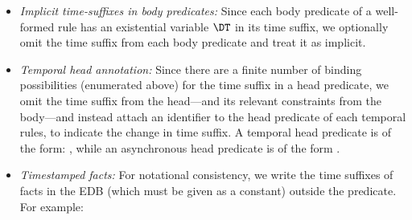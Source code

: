 \begin{itemize}
%
%
\item {\em Implicit time-suffixes in body predicates:} Since each body
predicate of a well-formed rule has an existential variable $\DT$ in its
time suffix, we optionally omit the time suffix from each body predicate and treat
it as implicit.
%
\item {\em Temporal head annotation:} Since there are a finite number of binding
possibilities (enumerated above) for the time suffix in a head predicate, we omit the time
suffix from the head---and its relevant constraints from the body---and
instead attach an identifier to the head predicate of each temporal rules, to indicate the change in
time suffix.  A temporal head predicate  is of the form: ,
while an asynchronous head predicate  is of the form .

\item {\em Timestamped facts:} For notational consistency, we write the time suffixes of facts in the EDB (which
must be given as a constant) outside the predicate.  For example:


%
%
%
%
%
\end{itemize}


